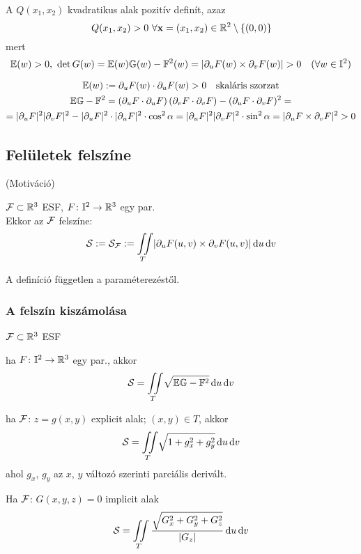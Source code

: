 \begin{te}
  A $Q(x_1,x_2)$ kvadratikus alak pozitív definít, azaz
  \[ Q(x_1,x_2) > 0\ \forall \mathbf{x}=(x_1,x_2) \in\mathbb{R}^2\setminus \{(0,0)\} \]
  mert
  \[ \mathbb E(w) > 0,\ \det G(w) = \mathbb E(w)\mathbb G(w) - \mathbb F^2(w) = | \partial_uF(w) \times\partial_vF(w) | >0
  \quad (\forall w\in\mathbb I^2)\]
\end{te}

\begin{biz}
  \begin{gather*}
    \mathbb E(w) :=  \partial_uF(w) \cdot \partial_uF(w)> 0\quad \text{skaláris szorzat}\\
    \mathbb E\mathbb G - \mathbb F^2 = (\partial_uF \cdot \partial_uF)\left(\partial_vF \cdot \partial_vF\right) - 
    (\partial_uF \cdot \partial_vF)^2 =\\
    = |\partial_uF|^2|\partial_vF|^2 - |\partial_uF|^2 \cdot |\partial_uF|^2 \cdot \cos^2 \alpha =  
    |\partial_uF|^2|\partial_vF|^2 \cdot \sin^2\alpha =  |\partial_uF\times\partial_vF|^2 > 0
  \end{gather*}
\end{biz}



\subsection{Felületek felszíne}
(Motiváció)
\begin{de}
  $\mathcal F\subset\mathbb{R}^3$ ESF, $F\colon \mathbb I^2\to\mathbb{R}^3$ egy par.\\
Ekkor az $\mathcal F$ felszíne:
\[ \fel := \fel_\F := \Iint_T\!|\partial_uF(u,v) \times \partial_vF(u,v)| \diff u \diff v \]  
\end{de}

\begin{te}
  A definíció független a paraméterezéstől.
\end{te}


\subsubsection{A felszín kiszámolása}

\begin{te}
  $\mathcal F\subset\mathbb{R}^3$ ESF
\begin{enumzjr}
\item ha $F\colon\mathbb I^2\to\mathbb{R}^3$ egy par., akkor
  \[ \fel = \Iint_T\!\sqrt{\eE\eG-\eF^2}\diff u \diff v\]
\item ha $\mathcal F$: $z=g(x,y)$ explicit alak; $(x,y)\in T$, akkor
  \[ \fel = \Iint_T\!\sqrt{1+g^2_x + g^2_y} \diff u \diff v\]
  ahol $g_x$, $g_y$ az $x$, $y$ változó szerinti parciális derivált.
\item Ha $\mathcal F$: $G(x,y,z) = 0$ implicit alak
  \[ \fel = \Iint_T \dfrac{\sqrt{G_x^2 + G_y^2 + G_z^2}}{|G_z|}\diff u \diff v\]\end{enumzjr}
\end{te}

